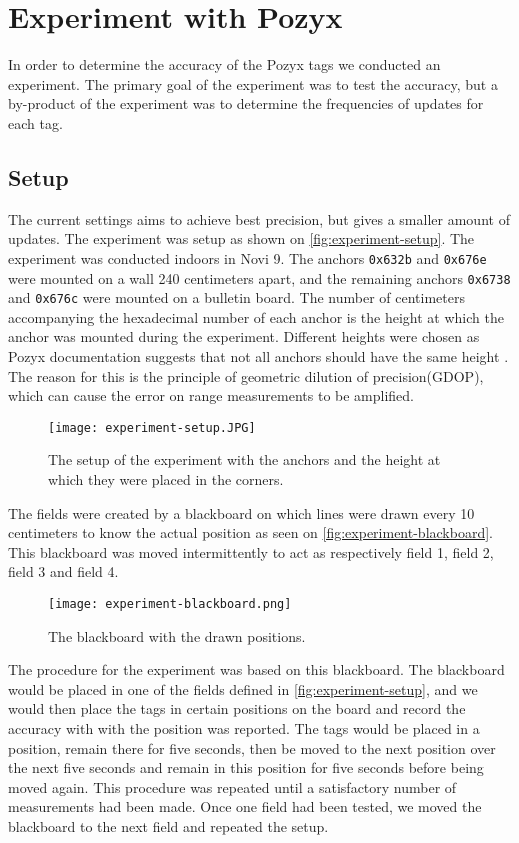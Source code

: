 \section{Experiment with Pozyx}
In order to determine the accuracy of the Pozyx tags we conducted an experiment.
The primary goal of the experiment was to test the accuracy, but a by-product of the experiment was to determine the frequencies of updates for each tag.

\subsection{Setup}
The current settings aims to achieve best precision, but gives a smaller amount of updates.
The experiment was setup as shown on \autoref{fig:experiment-setup}. 
The experiment was conducted indoors in Novi 9. 
The anchors \texttt{0x632b} and \texttt{0x676e} were mounted on a wall 240 centimeters apart, and the remaining anchors \texttt{0x6738} and \texttt{0x676c} were mounted on a bulletin board.
The number of centimeters accompanying the hexadecimal number of each anchor is the height at which the anchor was mounted during the experiment.
Different heights were chosen as Pozyx documentation suggests that not all anchors should have the same height \cite{pozyx-AnchorHeights}.
The reason for this is the principle of geometric dilution of precision(GDOP), which can cause the error on range measurements to be amplified.

\begin{figure}[H]
    \centering
    \texttt{[image: experiment-setup.JPG]}
    \caption{The setup of the experiment with the anchors and the height at which they were placed in the corners.}
    \label{fig:experiment-setup}
\end{figure}
\noindent
The fields were created by a blackboard on which lines were drawn every 10 centimeters to know the actual position as seen on \autoref{fig:experiment-blackboard}.
This blackboard was moved intermittently to act as respectively field 1, field 2, field 3 and field 4.

\begin{figure}[H]
    \centering
    \texttt{[image: experiment-blackboard.png]}
    \caption{The blackboard with the drawn positions.}
    \label{fig:experiment-blackboard}
\end{figure}
\noindent
The procedure for the experiment was based on this blackboard.
The blackboard would be placed in one of the fields defined in \autoref{fig:experiment-setup}, and we would then place the tags in certain positions on the board and record the accuracy with with the position was reported.
The tags would be placed in a position, remain there for five seconds, then be moved to the next position over the next five seconds and remain in this position for five seconds before being moved again.
This procedure was repeated until a satisfactory number of measurements had been made.
Once one field had been tested, we moved the blackboard to the next field and repeated the setup.
 
